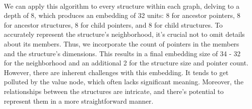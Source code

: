         \paragraph{}We can apply this algorithm to every \gls{structure} within each graph, delving to a depth of 8, which produces an embedding of 32 units: 8 for ancestor \glspl{pointer}, 8 for ancestor \glspl{structure}, 8 for child \glspl{pointer}, and 8 for child \glspl{structure}. To accurately represent the \gls{structure}'s neighborhood, it's crucial not to omit details about its members. Thus, we incorporate the count of \glspl{pointer} in the members and the \gls{structure}'s dimensions. This results in a final embedding size of 34 - 32 for the neighborhood and an additional 2 for the \gls{structure} size and \gls{pointer} count. However, there are inherent challenges with this embedding. It tends to get polluted by the value node, which often lacks significant meaning. Moreover, the relationships between the structures are intricate, and there's potential to represent them in a more straightforward manner.

        
        